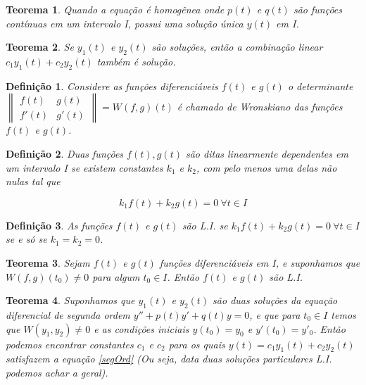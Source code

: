 \documentclass[12pt]{article}
\newtheorem{theorem}{Teorema}[section]
\newtheorem{definition}{Definição}
\begin{document}
\begin{theorem}
    Quando a equação é homogênea onde $p(t)$ e $q(t)$ são funções contínuas em um intervalo I, possui uma solução única $y(t)$ em I.
\end{theorem}

\begin{theorem}
    Se $y_1(t)$ e $y_2(t)$ são soluções, então a combinação linear $c_1 y_1(t) + c_2 y_2(t)$ também é solução.
\end{theorem}

\begin{definition}
    Considere as funções diferenciáveis $f(t)$ e $g(t)$ o determinante $\left \| \begin{array}{cc}
    f(t) & g(t) \\
    f'(t) & g'(t)
    \end{array} \right \| = W(f, g)(t)$ é chamado de Wronskiano das funções $f(t)$ e $g(t)$.
\end{definition}

\begin{definition}
    Duas funções $f(t), g(t)$ são ditas linearmente dependentes em um intervalo I se existem constantes $k_1$ e $k_2$, com pelo menos uma delas não nulas tal que
    
    $$k_1 f(t) + k_2 g(t) = 0 \ \forall t \in I$$
\end{definition}

\begin{definition}
    As funções $f(t)$ e $g(t)$ são L.I. se $k_1 f(t) + k_2 g(t) = 0 \ \forall t \in I$ se e só se $k_1 = k_2 = 0$.
\end{definition}

\begin{theorem}
    Sejam $f(t)$ e $g(t)$ funções diferenciáveis em I, e suponhamos que $W(f, g)(t_0) \neq 0$ para algum $t_0 \in I$. Então $f(t)$ e $g(t)$ são L.I.
\end{theorem}

\begin{theorem}
    Suponhamos que $y_1(t)$ e $y_2(t)$ são duas soluções da equação diferencial de segunda ordem $y'' + p(t) y' + q(t) y = 0$, e que para $t_0 \in I$ temos que $W(y_1, y_2) \neq 0$ e as condições iniciais $y(t_0) = y_0$ e $y'(t_0) = y'_0$. Então podemos encontrar constantes $c_1$ e $c_2$ para os quais $y(t) = c_1 y_1(t) + c_2 y_2(t)$ satisfazem a equação \ref{segOrd} (Ou seja, data duas soluções particulares L.I. podemos achar a geral).
\end{theorem}
\end{document}
